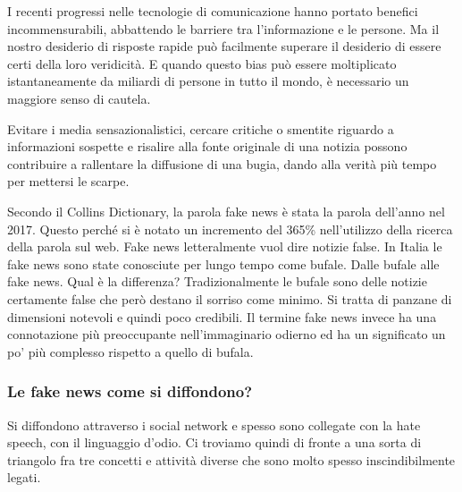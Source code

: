 \begin{itshape}
I recenti progressi nelle tecnologie di comunicazione hanno portato benefici incommensurabili, abbattendo le barriere tra l’informazione e le persone. Ma il nostro desiderio di risposte rapide può facilmente superare il desiderio di essere certi della loro veridicità. E quando questo bias può essere moltiplicato istantaneamente da miliardi di persone in tutto il mondo, è necessario un maggiore senso di cautela.

Evitare i media sensazionalistici, cercare critiche o smentite riguardo a informazioni sospette e risalire alla fonte originale di una notizia possono contribuire a rallentare la diffusione di una bugia, dando alla verità più tempo per mettersi le scarpe.
\end{itshape}\par 

Secondo il Collins Dictionary, la parola fake news è stata la parola dell'anno nel 2017. Questo perché si è notato un incremento del 365\% nell'utilizzo della ricerca della parola sul web. 
Fake news letteralmente vuol dire notizie false. In Italia le fake news sono state conosciute per lungo tempo come bufale. 
Dalle bufale alle fake news. Qual è la differenza? Tradizionalmente le bufale sono delle notizie certamente false che però destano il sorriso come minimo. Si tratta di panzane di dimensioni notevoli e quindi poco credibili. Il termine fake news invece ha una connotazione più preoccupante nell'immaginario odierno ed ha un significato un po' più complesso rispetto a quello di bufala.
\subsubsection{Le fake news come si diffondono?} 
Si diffondono attraverso i social network e spesso sono collegate con la hate speech, con il linguaggio d'odio. Ci troviamo quindi di fronte a una sorta di triangolo fra tre concetti e attività diverse che sono molto spesso inscindibilmente legati. 

